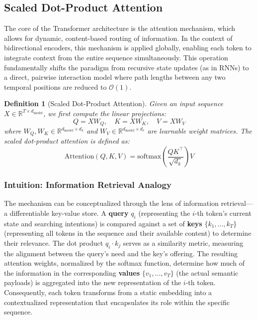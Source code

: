 \documentclass[11pt]{article}
\newtheorem{definition}[theorem]{Definition}
\begin{document}
\subsection{Scaled Dot-Product Attention}

The core of the Transformer architecture is the attention mechanism, which allows for dynamic, content-based routing of information. In the context of bidirectional encoders, this mechanism is applied globally, enabling each token to integrate context from the entire sequence simultaneously. This operation fundamentally shifts the paradigm from recursive state updates (as in RNNs) to a direct, pairwise interaction model where path lengths between any two temporal positions are reduced to $\mathcal{O}(1)$.

\begin{definition}[Scaled Dot-Product Attention]
Given an input sequence $X \in \mathbb{R}^{T \times d_{\text{model}}}$, we first compute the linear projections:
\begin{equation}
  Q = XW_Q, \quad K = XW_K, \quad V = XW_V
\end{equation}
where $W_Q, W_K \in \mathbb{R}^{d_{\text{model}} \times d_k}$ and $W_V \in \mathbb{R}^{d_{\text{model}} \times d_v}$ are learnable weight matrices. The scaled dot-product attention is defined as:
\begin{equation}
  \text{Attention}(Q, K, V) = \text{softmax} \!\left( \frac{QK^\top}{\sqrt{d_k}} \right) V
  \label{eq:attention_formal}
\end{equation}
\end{definition}

\subsubsection{Intuition: Information Retrieval Analogy}
The mechanism can be conceptualized through the lens of information retrieval—a differentiable key-value store. A \textbf{query} $q_i$ (representing the $i$-th token's current state and searching intentions) is compared against a set of \textbf{keys} $\{k_1, \ldots, k_T\}$ (representing all tokens in the sequence and their available content) to determine their relevance. The dot product $q_i \cdot k_j$ serves as a similarity metric, measuring the alignment between the query's need and the key's offering. The resulting attention weights, normalized by the softmax function, determine how much of the information in the corresponding \textbf{values} $\{v_1, \ldots, v_T\}$ (the actual semantic payloads) is aggregated into the new representation of the $i$-th token. Consequently, each token transforms from a static embedding into a contextualized representation that encapsulates its role within the specific sequence.
\end{document}
